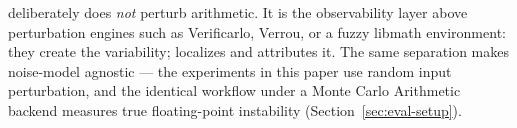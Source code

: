\pyt{} deliberately does \emph{not} perturb arithmetic. It is the
observability layer above perturbation engines such as Verificarlo,
Verrou, or a fuzzy libmath environment: they create the variability;
\pyt{} localizes and attributes it. The same separation makes \pyt{}
noise-model agnostic --- the experiments in this paper use random input
perturbation, and the identical workflow under a Monte Carlo Arithmetic
backend measures true floating-point instability
(Section~\ref{sec:eval-setup}).
